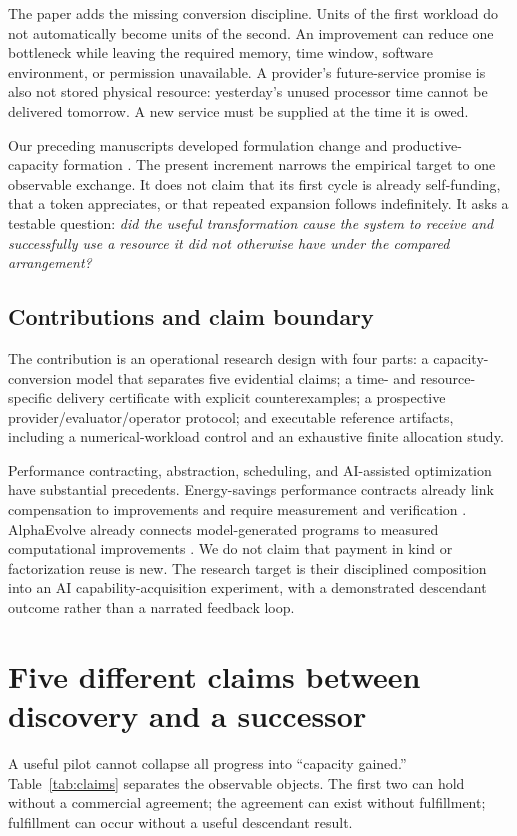 \documentclass[11pt,letterpaper]{article}
\theoremstyle{remark}\newtheorem{remark}{Remark}[section]
\begin{document}
The paper adds the missing conversion discipline. Units of the first workload do not automatically become units of the second. An improvement can reduce one bottleneck while leaving the required memory, time window, software environment, or permission unavailable. A provider's future-service promise is also not stored physical resource: yesterday's unused processor time cannot be delivered tomorrow. A new service must be supplied at the time it is owed.

Our preceding manuscripts developed formulation change and productive-capacity formation \citep{boucherOriginal,boucherProduction}. The present increment narrows the empirical target to one observable exchange. It does not claim that its first cycle is already self-funding, that a token appreciates, or that repeated expansion follows indefinitely. It asks a testable question: \emph{did the useful transformation cause the system to receive and successfully use a resource it did not otherwise have under the compared arrangement?}

\subsection{Contributions and claim boundary}
The contribution is an operational research design with four parts: a capacity-conversion model that separates five evidential claims; a time- and resource-specific delivery certificate with explicit counterexamples; a prospective provider/evaluator/operator protocol; and executable reference artifacts, including a numerical-workload control and an exhaustive finite allocation study.

Performance contracting, abstraction, scheduling, and AI-assisted optimization have substantial precedents. Energy-savings performance contracts already link compensation to improvements and require measurement and verification \citep{doeContract,doeMV}. AlphaEvolve already connects model-generated programs to measured computational improvements \citep{alphaevolve}. We do not claim that payment in kind or factorization reuse is new. The research target is their disciplined composition into an AI capability-acquisition experiment, with a demonstrated descendant outcome rather than a narrated feedback loop.

\section{Five different claims between discovery and a successor}
\label{sec:claims}
A useful pilot cannot collapse all progress into ``capacity gained.'' Table~\ref{tab:claims} separates the observable objects. The first two can hold without a commercial agreement; the agreement can exist without fulfillment; fulfillment can occur without a useful descendant result.
\end{document}

